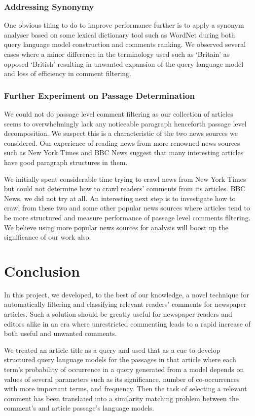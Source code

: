 \documentclass[article]{IEEEtran}
\begin{document}
\subsubsection{Addressing Synonymy}
One obvious thing to do to improve performance further is to apply a synonym analyser based on some lexical dictionary tool such as WordNet \cite{Miller:1995:WLD:219717.219748} during both query language model construction and comments ranking. We observed several cases where a minor difference in the terminology used such as `Britain' as opposed `British' resulting in unwanted expansion of the query language model and loss of efficiency in comment filtering.    

\subsubsection{Further Experiment on Passage Determination} We could not do passage level comment filtering as our collection of articles seems to overwhelmingly lack any noticeable paragraph henceforth passage level decomposition. We suspect this is a characteristic of the two news sources we considered. Our experience of reading news from more renowned news sources such as New York Times and BBC News suggest that many interesting articles have good paragraph structures in them. 

We initially spent considerable time trying to crawl news from New York Times but could not determine how to crawl readers' comments from its articles. BBC News, we did not try at all. An interesting next step is to investigate how to crawl from these two and some other popular news sources where articles tend to be more structured and measure performance of passage level comments filtering. We believe using more popular news sources for analysis will boost up the significance of our work also.     
 
\section{Conclusion}
\label{con}
In this project, we developed, to the best of our knowledge, a novel technique for automatically filtering and classifying relevant readers' comments for newspaper articles. Such a solution should be greatly useful for newspaper readers and editors alike in an era where unrestricted commenting leads to a rapid increase of both useful and unwanted comments.

We treated an article title as a query and used that as a cue to develop structured query language models for the passages in that article where each term's probability of occurrence in a query generated from a model depends on values of several parameters such as its significance, number of co-occurrences with more important terms, and frequency. Then the task of selecting a relevant comment has been translated into a similarity matching problem between the comment's and article passage's language models. 
\end{document}
